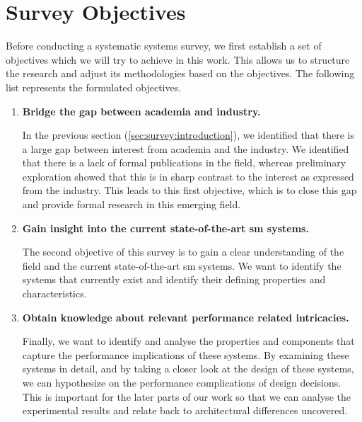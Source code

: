 \section{Survey Objectives}
\label{sec:survey:objectives}


Before conducting a systematic systems survey, we first establish a set of objectives which we will try to achieve in this work. This allows us to structure the research and adjust its methodologies based on the objectives. The following list represents the formulated objectives.

\begin{enumerate}[label=\textbf{O\arabic*}, leftmargin=3\parindent]
    \item \textbf{Bridge the gap between academia and industry.}
    \label{obj:survey:1}
    
    In the previous section (\cref{sec:survey:introduction}), we identified that there is a large gap between interest from academia and the industry. We identified that there is a lack of formal publications in the field, whereas preliminary exploration showed that this is in sharp contrast to the interest as expressed from the industry. This leads to this first objective, which is to close this gap and provide formal research in this emerging field.
    
    \item \textbf{Gain insight into the current state-of-the-art \gls{sm} systems.}
    \label{obj:survey:2}
    
    The second objective of this survey is to gain a clear understanding of the field and the current state-of-the-art \gls{sm} systems. We want to identify the systems that currently exist and identify their defining properties and characteristics.

    \item \textbf{Obtain knowledge about relevant performance related intricacies.}
    \label{obj:survey:3}
    
    Finally, we want to identify and analyse the properties and components that capture the performance implications of these systems. By examining these systems in detail, and by taking a closer look at the design of these systems, we can hypothesize on the performance complications of design decisions. This is important for the later parts of our work so that we can analyse the experimental results and relate back to architectural differences uncovered.
    
\end{enumerate}

